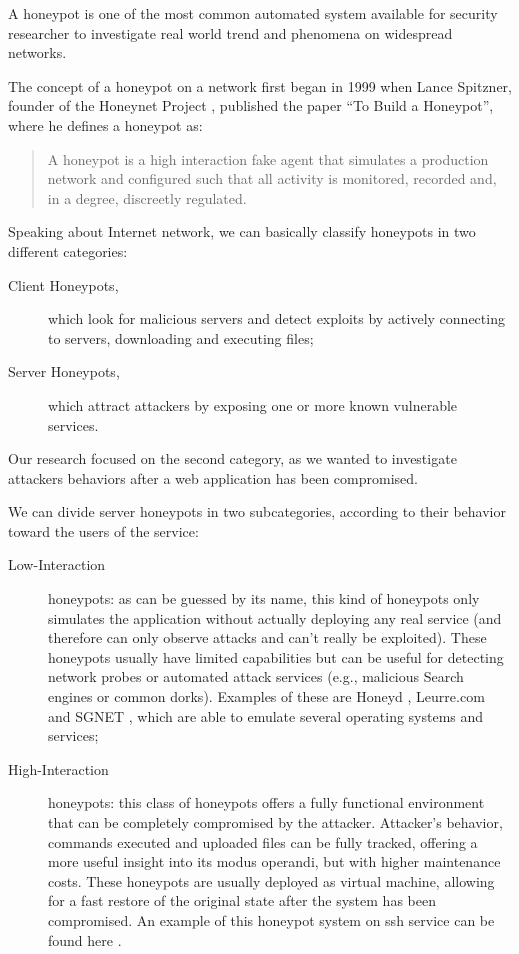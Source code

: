 A honeypot is one of the most common automated system available for security researcher to investigate real world trend and phenomena on widespread networks.

The concept of a honeypot on a network first began in 1999 when Lance Spitzner, founder of the Honeynet Project \cite{honeynetProject}, published the paper ``To Build a Honeypot'', where he defines a honeypot as:
\begin{quote}
A honeypot is a high interaction fake agent that simulates a production network and configured such that all activity is monitored, recorded and, in a degree, discreetly regulated.
\end{quote}
Speaking about Internet network, we can basically classify honeypots in two different categories:
\begin{description}
\item[Client Honeypots,] which look for malicious servers and detect exploits by actively connecting to servers, downloading and executing files;
\item[Server Honeypots,] which attract attackers by exposing one or more known vulnerable services.
\end{description}
Our research focused on the second category, as we wanted to investigate attackers behaviors after a web application has been compromised.

We can divide server honeypots in two subcategories, according to their behavior toward the users of the service:
\begin{description}
\item[Low-Interaction] honeypots: as can be guessed by its name, this kind of honeypots only simulates the application without actually deploying any real service (and therefore can only observe attacks and can't really be exploited). These honeypots usually have limited capabilities but can be useful for detecting network probes or automated attack services (e.g., malicious Search engines or common dorks). Examples of these are Honeyd \cite{honeyd}, Leurre.com \cite{leurre} and SGNET \cite{sgnet}, which are able to emulate several operating systems and services;
\item[High-Interaction] honeypots: this class of honeypots offers a fully functional environment that can be completely compromised by the attacker. Attacker's behavior, commands executed and uploaded files can be fully tracked, offering a more useful insight into its modus operandi, but with higher maintenance costs. These honeypots are usually deployed as virtual machine, allowing for a fast restore of the original state after the system has been compromised. An example of this honeypot system on ssh service can be found here \cite{highhoney}.
\end{description}

